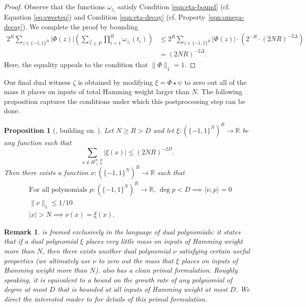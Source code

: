 \documentclass[11pt, letterpaper, fleqn]{article}
\newtheorem{remark}{Remark}
\newtheorem{proposition}[theorem]{Proposition}
\theoremstyle{plain}
\newcommand{\R}{\mathbb{R}}
\newcommand{\bits}{\{-1,1\}}
\newcommand{\ls}{\star}
\begin{document}
\begin{proof}
Observe that the functions $\omega_{z_i}$ satisfy Condition \eqref{eqn:eta-bound} (cf. Equation \eqref{eq:sweeteq}) and Condition \eqref{eqn:eta-decay} (cf. Property~\eqref{eqn:omega-decay}). We complete the proof by bounding
\begin{align*}
2^R \sum_{z \in \bits^R} |\Phi(z)| \left( \sum_{\vec{t} \in P} \prod_{i = 1}^R \omega_{z_i}(t_i) \right) &\le 2^R \sum_{z \in \bits^R} |\Phi(z)| \cdot \left(2^{-R} \cdot (2NR)^{-2\Delta}\right)\\
&=(2NR)^{-2 \Delta} .
\end{align*}
Here, the equality appeals to the condition that $\|\Phi\|_1 = 1$.
\end{proof}


Our final dual witness $\zeta$ is obtained by modifying $\xi = \Phi \ls \psi$ to zero out all of the mass it places on inputs of total Hamming weight larger than $N$. The following proposition captures the conditions under which this postprocessing step can be done. 


\begin{proposition}[{\cite[Proposition 34]{adegsurj}, building on~\cite{razborovsherstov}}] \label{prop:correction}
Let $N \ge R > D$ and let $\xi : (\bits^N)^R \to \R$ be any function such that
\[\sum_{x \notin H_{\le N}^{N \cdot R}} |\xi(x)| \le (2NR)^{-2D}.\]
Then there exists a function $\nu : (\bits^N)^R \to \R$ such that
\begin{align*}
  &\text{For all polynomials } p \colon (\bits^N)^R  \to \R\text{, } \deg p < D \implies \langle \nu, p \rangle = 0    \\
   &\|\nu\|_1 \le 1/10     \\
   &|x| > N \implies \nu(x) = \xi(x).    
\end{align*}
\end{proposition}

\begin{remark}
 is framed exclusively in the language 
of dual polynomials: it states that if a dual polynomial $\xi$ places very little mass on inputs
of Hamming weight more than $N$,
then there exists another dual polynomial $\nu$ satisfying certain useful properties
(we ultimately use $\nu$ to zero out the mass that $\xi$ places on inputs of Hamming weight more than $N$).
 also has a clean \emph{primal} formulation. Roughly speaking,
it is equivalent to a bound on the growth rate of any polynomial of degree at most $D$ that is bounded at
all inputs of Hamming weight at most $D$. We direct the interested
reader to \cite{violalecturenotes} for details of this primal formulation.
\end{remark}
\end{document}
